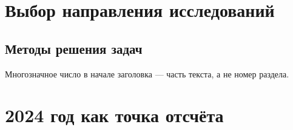\section{Выбор направления исследований}

\subsection{Методы решения задач}

Многозначное число в начале заголовка — часть текста, а не номер раздела.

\section{2024 год как точка отсчёта}
